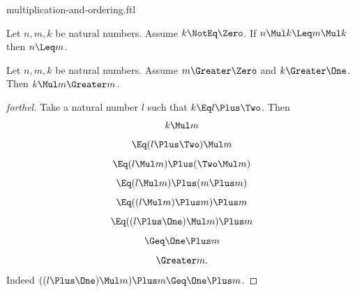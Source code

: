 \documentclass{stex}
\begin{document}
\begin{smodule}{multiplication-and-ordering.ftl}
\begin{proposition*}[forthel]
  Let $n, m, k$ be natural numbers.
  Assume $k \NotEq \Zero$.
  If $n \Mul k \Leq m \Mul k$ then $n \Leq m$.
\end{proposition*}

\begin{proposition*}[forthel]
  Let $n, m, k$ be natural numbers.
  Assume $m \Greater \Zero$ and $k \Greater \One$.
  Then $k \Mul m \Greater m$.
\end{proposition*}
\begin{proof}[forthel]
  Take a natural number $l$ such that $k \Eq l \Plus \Two$.
  Then
  \[  k \Mul m                       \]
  \[    \Eq (l \Plus \Two) \Mul m             \]
  \[    \Eq (l \Mul m) \Plus (\Two \Mul m)   \]
  \[    \Eq (l \Mul m) \Plus (m \Plus m)       \]
  \[    \Eq ((l \Mul m) \Plus m) \Plus m       \]
  \[    \Eq ((l \Plus \One) \Mul m) \Plus m       \]
  \[    \Geq \One \Plus m                    \]
  \[    \Greater m.                          \]
  Indeed $((l \Plus \One) \Mul m) \Plus m \Geq \One \Plus m$.
\end{proof}

\end{smodule}
\end{document}
